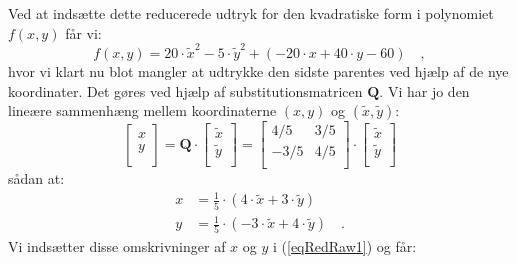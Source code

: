 \begin{example}
Ved at indsætte dette reducerede udtryk for den kvadratiske form i polynomiet $f(x,y)$ får vi:
\begin{equation} \label{eqRedRaw1}
f(x,y) = 20\cdot \widetilde{x}^{2} - 5\cdot \widetilde{y}^{2} + (- 20\cdot x + 40\cdot y - 60) \quad ,
\end{equation}
hvor vi klart nu blot mangler at udtrykke den sidste parentes ved hjælp af de nye koordinater. Det gøres ved hjælp af
substitutionsmatricen $\mathbf{Q}$. Vi har jo den lineære sammenhæng mellem koordinaterne $(x, y)$ og $(\widetilde{x}, \widetilde{y})$:
\begin{equation}
\left[
  \begin{array}{c}
    x \\
    y \\
  \end{array}
\right] = \mathbf{Q}\cdot \left[
                            \begin{array}{c}
                              \widetilde{x} \\
                              \widetilde{y} \\
                            \end{array}
                          \right] = \left[
              \begin{array}{cc}
                4/5 & 3/5 \\
                -3/5 & 4/5 \\
              \end{array}
            \right] \cdot \left[
                            \begin{array}{c}
                              \widetilde{x} \\
                              \widetilde{y} \\
                            \end{array}
                          \right]
\end{equation}
sådan at:
\begin{equation}
\begin{aligned}
x &= \frac{1}{5}\cdot (4\cdot \widetilde{x} + 3\cdot \widetilde{y}) \\
y &= \frac{1}{5}\cdot (-3\cdot \widetilde{x} + 4\cdot \widetilde{y})\quad .
\end{aligned}
\end{equation}
Vi indsætter disse omskrivninger af $x$ og $y$ i (\ref{eqRedRaw1}) og får:
\begin{equation}
\begin{aligned}

\end{aligned}
\end{equation}
\end{example}
